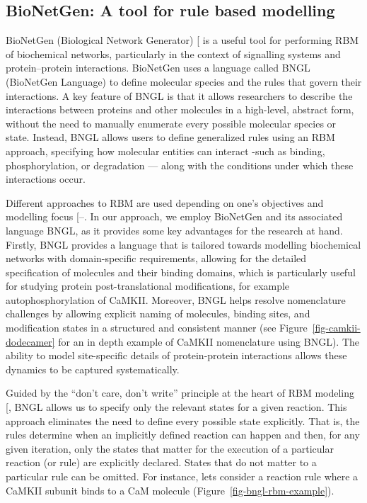 \documentclass[
  11pt,
  letterpaper,
]{scrreprt}
\begin{document}
\subsection*{BioNetGen: A tool for rule based
modelling}\label{bionetgen-a-tool-for-rule-based-modelling}

BioNetGen (Biological Network Generator)
{[}\citeproc{ref-harris2016BioNetGena}{245}{]} is a useful tool for
performing RBM of biochemical networks, particularly in the context of
signalling systems and protein--protein interactions. BioNetGen uses a
language called BNGL (BioNetGen Language) to define molecular species
and the rules that govern their interactions. A key feature of BNGL is
that it allows researchers to describe the interactions between proteins
and other molecules in a high-level, abstract form, without the need to
manually enumerate every possible molecular species or state. Instead,
BNGL allows users to define generalized rules using an RBM approach,
specifying how molecular entities can interact -such as binding,
phosphorylation, or degradation --- along with the conditions under
which these interactions occur.

Different approaches to RBM are used depending on one's objectives and
modelling focus
{[}--\citeproc{ref-boutillier2018Kappa}{292}{]}.
In our approach, we employ BioNetGen and its associated language BNGL,
as it provides some key advantages for the research at hand. Firstly,
BNGL provides a language that is tailored towards modelling biochemical
networks with domain-specific requirements, allowing for the detailed
specification of molecules and their binding domains, which is
particularly useful for studying protein post-translational
modifications, for example autophosphorylation of CaMKII. Moreover, BNGL
helps resolve nomenclature challenges by allowing explicit naming of
molecules, binding sites, and modification states in a structured and
consistent manner (see Figure~\ref{fig-camkii-dodecamer} for an in depth
example of CaMKII nomenclature using BNGL). The ability to model
site-specific details of protein-protein interactions allows these
dynamics to be captured systematically.

Guided by the ``don't care, don't write'' principle at the heart of RBM
modeling {[}\citeproc{ref-chylek2014Rulebased}{287}{]}, BNGL allows us
to specify only the relevant states for a given reaction. This approach
eliminates the need to define every possible state explicitly. That is,
the rules determine when an implicitly defined reaction can happen and
then, for any given iteration, only the states that matter for the
execution of a particular reaction (or rule) are explicitly declared.
States that do not matter to a particular rule can be omitted. For
instance, lets consider a reaction rule where a CaMKII subunit binds to
a CaM molecule (Figure~\ref{fig-bngl-rbm-example}).
\end{document}
